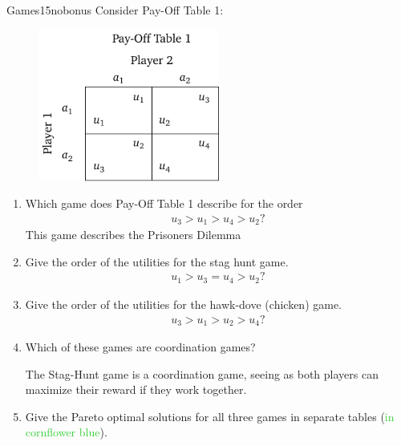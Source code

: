 \documentclass[twoside,english,colorbacktitle,accentcolor=tud9c,10pt]{tudexercise}
\begin{document}
\begin{questions}

\begin{question}{Games}{15}{nobonus}
	Consider Pay-Off Table 1:
	\begin{figure}[h]
	\centering
		\includegraphics[height=5cm]{payoff_table.pdf}
	\end{figure}
	\begin{enumerate}
		\item Which game does Pay-Off Table 1 describe for the order
		\begin{align}
		    u_{3} > u_{1} > u_{4} > u_{2}? \nonumber
		\end{align}
		This game describes the Prisoners Dilemma
		\item Give the order of the utilities for the stag hunt game.
		\begin{align}
		    u_{1} > u_{3} = u_{4} > u_{2}? \nonumber
		\end{align}
		\item Give the order of the utilities for the hawk-dove (chicken) game.
		\begin{align}
		    u_{3} > u_{1} > u_{2} > u_{4}? \nonumber
		\end{align}
		\item Which of these games are coordination games?

		The Stag-Hunt game is a coordination game, seeing as both players can maximize their reward if they work together.
		\item Give the Pareto optimal solutions for all three games in separate tables (\textcolor{LimeGreen}{in cornflower blue}).


\end{enumerate}
\end{question}
\end{questions}
\end{document}
